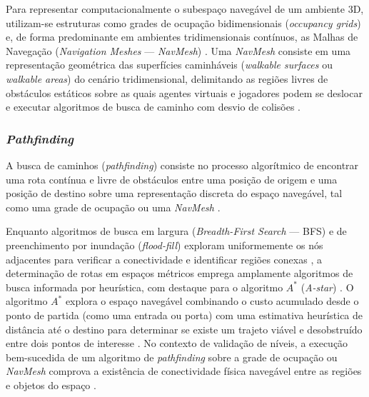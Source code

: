 Para representar computacionalmente o subespaço navegável de um ambiente 3D, utilizam-se estruturas como grades de ocupação bidimensionais (\textit{occupancy grids}) \cite{sun2024roomplanner} e, de forma predominante em ambientes tridimensionais contínuos, as Malhas de Navegação (\textit{Navigation Meshes} --- \textit{NavMesh}) \cite{xu2025constraint, xu2025databasedrivenframework3dlevel, regmi2025system}. Uma \textit{NavMesh} consiste em uma representação geométrica das superfícies caminháveis (\textit{walkable surfaces} ou \textit{walkable areas}) do cenário tridimensional, delimitando as regiões livres de obstáculos estáticos sobre as quais agentes virtuais e jogadores podem se deslocar e executar algoritmos de busca de caminho com desvio de colisões \cite{xu2025constraint, xu2025databasedrivenframework3dlevel, regmi2025system}.

\subsubsection{\textit{Pathfinding}}
\label{sec:pathfinding}

A busca de caminhos (\textit{pathfinding}) consiste no processo algorítmico de encontrar uma rota contínua e livre de obstáculos entre uma posição de origem e uma posição de destino sobre uma representação discreta do espaço navegável, tal como uma grade de ocupação ou uma \textit{NavMesh} \cite{sun2024roomplanner, nasir2024word2worldgeneratingstoriesworlds, xu2025databasedrivenframework3dlevel}.

Enquanto algoritmos de busca em largura (\textit{Breadth-First Search} --- BFS) e de preenchimento por inundação (\textit{flood-fill}) exploram uniformemente os nós adjacentes para verificar a conectividade e identificar regiões conexas \cite{xu2025databasedrivenframework3dlevel}, a determinação de rotas em espaços métricos emprega amplamente algoritmos de busca informada por heurística, com destaque para o algoritmo $A^*$ (\textit{A-star}) \cite{sun2024roomplanner, nasir2024word2worldgeneratingstoriesworlds, xu2025databasedrivenframework3dlevel}. O algoritmo $A^*$ explora o espaço navegável combinando o custo acumulado desde o ponto de partida (como uma entrada ou porta) com uma estimativa heurística de distância até o destino para determinar se existe um trajeto viável e desobstruído entre dois pontos de interesse \cite{sun2024roomplanner, nasir2024word2worldgeneratingstoriesworlds, xu2025databasedrivenframework3dlevel}. No contexto de validação de níveis, a execução bem-sucedida de um algoritmo de \textit{pathfinding} sobre a grade de ocupação ou \textit{NavMesh} comprova a existência de conectividade física navegável entre as regiões e objetos do espaço \cite{sun2024roomplanner, xu2025databasedrivenframework3dlevel}.

